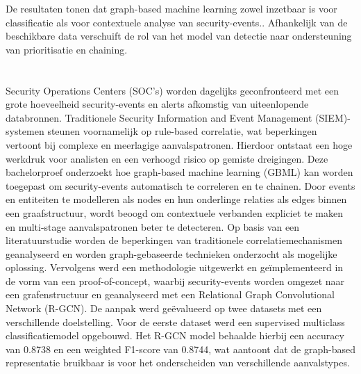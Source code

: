 {    \newline
    \newline
    De resultaten tonen dat graph-based machine learning zowel inzetbaar is voor classificatie als voor contextuele analyse van security-events.. Afhankelijk van de beschikbare data verschuift de rol van het model van detectie naar ondersteuning van prioritisatie en chaining.
}{}


\chapter*{}

Security Operations Centers (SOC’s) worden dagelijks geconfronteerd met een grote hoeveelheid security-events en alerts afkomstig van uiteenlopende databronnen. Traditionele Security Information and Event Management (SIEM)-systemen steunen voornamelijk op rule-based correlatie, wat beperkingen vertoont bij complexe en meerlagige aanvalspatronen. Hierdoor ontstaat een hoge werkdruk voor analisten en een verhoogd risico op gemiste dreigingen.
\newline
\newline
Deze bachelorproef onderzoekt hoe graph-based machine learning (GBML) kan worden toegepast om security-events automatisch te correleren en te chainen. Door events en entiteiten te modelleren als nodes en hun onderlinge relaties als edges binnen een graafstructuur, wordt beoogd om contextuele verbanden expliciet te maken en multi-stage aanvalspatronen beter te detecteren.
\newline
\newline
Op basis van een literatuurstudie worden de beperkingen van traditionele correlatiemechanismen geanalyseerd en worden graph-gebaseerde technieken onderzocht als mogelijke oplossing. Vervolgens werd een methodologie uitgewerkt en geïmplementeerd in de vorm van een proof-of-concept, waarbij security-events worden omgezet naar een grafenstructuur en geanalyseerd met een Relational Graph Convolutional Network (R-GCN).
\newline
\newline
De aanpak werd geëvalueerd op twee datasets met een verschillende doelstelling. Voor de eerste dataset werd een supervised multiclass classificatiemodel opgebouwd. Het R-GCN model behaalde hierbij een accuracy van 0.8738 en een weighted F1-score van 0.8744, wat aantoont dat de graph-based representatie bruikbaar is voor het onderscheiden van verschillende aanvalstypes.
